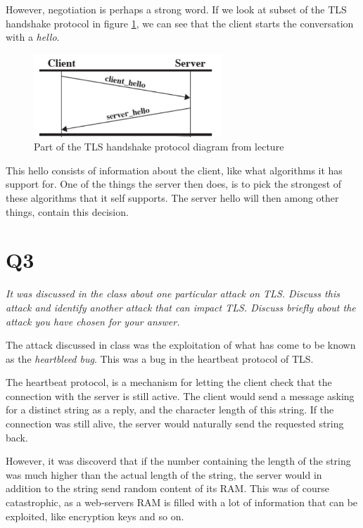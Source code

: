 \documentclass{article}
\begin{document}
However, negotiation is perhaps a strong word. If we look at subset of the TLS handshake protocol in figure \ref{TLS}, we can see that the client starts the conversation with a \textit{hello}.


\begin{figure}[H]
 \centering
  \includegraphics[width=200pt]{img/tlsHandshake.png}
 \caption{Part of the TLS handshake protocol diagram from lecture}
  \label{TLS}
 \end{figure}


This hello consists of information about the client, like what algorithms it has support for. One of the things the server then does, is to pick the strongest of these algorithms that it self supports. The server hello will then among other things, contain this decision.



\newpage
\section{Q3}
\begin{tcolorbox}
  \textit{It was discussed in the class about one particular attack on TLS. Discuss this attack and identify another attack that can impact TLS. Discuss briefly about the attack you have chosen for your answer.}
\end{tcolorbox}
The attack discussed in class was the exploitation of what has come to be known as the \textit{heartbleed bug}. This was a bug in the heartbeat protocol of TLS.

The heartbeat protocol, is a mechanism for letting the client check that the connection with the server is still active. The client would send a message asking for a distinct string as a reply, and the character length of this string. If the connection was still alive, the server would naturally send the requested string back.

However, it was discoverd that if the number containing the length of the string was much higher than the actual length of the string, the server would in addition to the string send random content of its RAM. This was of course catastrophic, as a web-servers RAM is filled with a lot of information that can be exploited, like encryption keys and so on.
\end{document}

